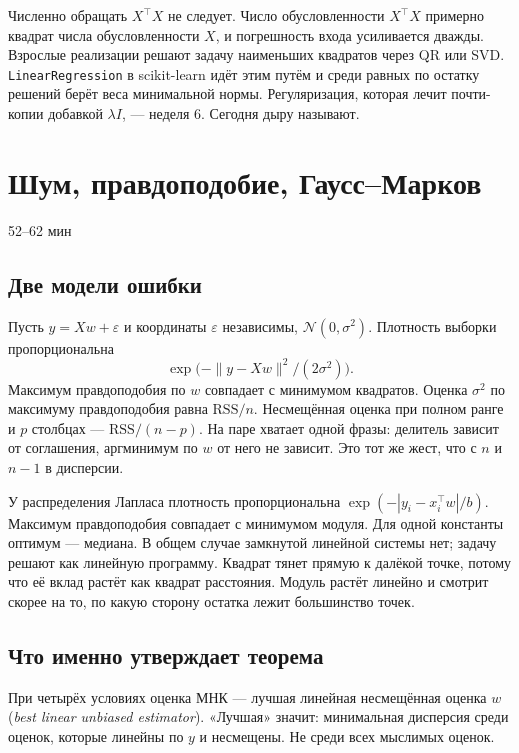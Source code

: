 \documentclass[11pt,a4paper]{article}
\newcommand{\timing}[1]{\hfill{\small\color{blue}#1}}
\begin{document}
Численно обращать \(X^{\top}X\) не следует. Число обусловленности \(X^{\top}X\) примерно квадрат числа обусловленности \(X\), и погрешность входа усиливается дважды. Взрослые реализации решают задачу наименьших квадратов через QR или SVD. \texttt{LinearRegression} в scikit-learn идёт этим путём и среди равных по остатку решений берёт веса минимальной нормы. Регуляризация, которая лечит почти-копии добавкой \(\lambda I\), --- неделя 6. Сегодня дыру называют.

\section{Шум, правдоподобие, Гаусс--Марков}

\timing{52--62 мин}

\subsection{Две модели ошибки}

Пусть \(y=Xw+\varepsilon\) и координаты \(\varepsilon\) независимы, \(\mathcal N(0,\sigma^{2})\). Плотность выборки пропорциональна
\[
\exp\bigl(-\|y-Xw\|^{2}/(2\sigma^{2})\bigr).
\]
Максимум правдоподобия по \(w\) совпадает с минимумом квадратов. Оценка \(\sigma^{2}\) по максимуму правдоподобия равна \(\mathrm{RSS}/n\). Несмещённая оценка при полном ранге и \(p\) столбцах --- \(\mathrm{RSS}/(n-p)\). На паре хватает одной фразы: делитель зависит от соглашения, аргминимум по \(w\) от него не зависит. Это тот же жест, что с \(n\) и \(n-1\) в дисперсии.

У распределения Лапласа плотность пропорциональна \(\exp(-|y_i-x_i^{\top}w|/b)\). Максимум правдоподобия совпадает с минимумом модуля. Для одной константы оптимум --- медиана. В общем случае замкнутой линейной системы нет; задачу решают как линейную программу. Квадрат тянет прямую к далёкой точке, потому что её вклад растёт как квадрат расстояния. Модуль растёт линейно и смотрит скорее на то, по какую сторону остатка лежит большинство точек.

\subsection{Что именно утверждает теорема}

При четырёх условиях оценка МНК --- лучшая линейная несмещённая оценка \(w\) (\emph{best linear unbiased estimator}). «Лучшая» значит: минимальная дисперсия среди оценок, которые линейны по \(y\) и несмещены. Не среди всех мыслимых оценок.
\end{document}
